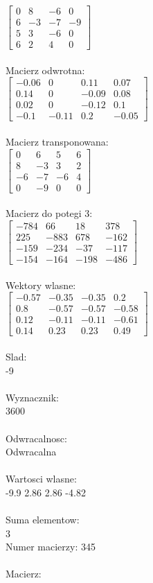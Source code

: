 \documentclass[a4paper,12pt]{article}
\begin{document}
$\begin{bmatrix} 0&8&-6&0\\6&-3&-7&-9\\5&3&-6&0\\6&2&4&0 \end{bmatrix}$
\\
\\
Macierz odwrotna:\\

$\begin{bmatrix} -0.06&0&0.11&0.07\\0.14&0&-0.09&0.08\\0.02&0&-0.12&0.1\\-0.1&-0.11&0.2&-0.05 \end{bmatrix}$
\\
\\
Macierz transponowana:\\

$\begin{bmatrix} 0&6&5&6\\8&-3&3&2\\-6&-7&-6&4\\0&-9&0&0 \end{bmatrix}$
\\
\\
Macierz do potegi 3:\\

$\begin{bmatrix} -784&66&18&378\\225&-883&678&-162\\-159&-234&-37&-117\\-154&-164&-198&-486 \end{bmatrix}$
\\
\\
Wektory wlasne:\\

$\begin{bmatrix} -0.57&-0.35&-0.35&0.2\\0.8&-0.57&-0.57&-0.58\\0.12&-0.11&-0.11&-0.61\\0.14&0.23&0.23&0.49 \end{bmatrix}$
\\
\\
Slad:\\
-9
\\
\\
Wyznacznik:\\
3600
\\
\\
Odwracalnosc:\\
Odwracalna
\\
\\
Wartosci wlasne:\\
-9.9 2.86 2.86 -4.82
\\
\\
Suma elementow:\\
3
\\
\newpage
Numer macierzy:
345
\\
\\
Macierz:\\
\end{document}
